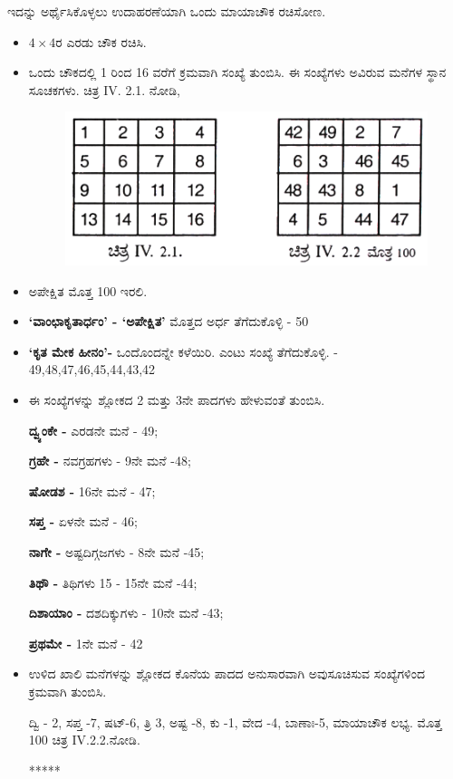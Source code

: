 ಇದನ್ನು ಅರ್ಥೈಸಿಕೊಳ್ಳಲು ಉದಾಹರಣೆಯಾಗಿ ಒಂದು ಮಾಯಾಚೌಕ ರಚಿಸೋಣ.
\begin{itemize}
	\item $4 \times 4$ರ ಎರಡು ಚೌಕ ರಚಿಸಿ.
	\item ಒಂದು ಚೌಕದಲ್ಲಿ 1 ರಿಂದ 16 ವರೆಗೆ ಕ್ರಮವಾಗಿ ಸಂಖ್ಯೆ ತುಂಬಿಸಿ. ಈ ಸಂಖ್ಯೆಗಳು ಅವಿರುವ ಮನೆಗಳ ಸ್ಥಾನ ಸೂಚಕಗಳು. ಚಿತ್ರ IV. 2.1. ನೋಡಿ,
	\begin{figure}[h]
	\includegraphics[scale=.9]{src/figures/chap3/fig3.40.jpg}
	\end{figure}
	\item ಅಪೇಕ್ಷಿತ ಮೊತ್ತ 100 ಇರಲಿ.
	\item \textbf{‘ವಾಂಛಾಕೃತಾರ್ಧಂ’ - ‘ಅಪೇಕ್ಷಿತ’} ಮೊತ್ತದ ಅರ್ಧ ತೆಗೆದುಕೊಳ್ಳಿ - 50
	\item \textbf{‘ಕೃತ ಮೇಕ ಹೀನಂ’-} ಒಂದೊಂದನ್ನೇ ಕಳೆಯಿರಿ. ಎಂಟು ಸಂಖ್ಯೆ ತೆಗೆದುಕೊಳ್ಳಿ. - 49,48,47,46,45,44,43,42
	\item ಈ ಸಂಖ್ಯೆಗಳನ್ನು ಶ್ಲೋಕದ 2 ಮತ್ತು 3ನೇ ಪಾದಗಳು ಹೇಳುವಂತೆ ತುಂಬಿಸಿ.

	\textbf{ದ್ವ್ಯಂಕೇ - }ಎರಡನೇ ಮನೆ - 49;

	\textbf{ಗ್ರಹೇ -} ನವಗ್ರಹಗಳು - 9ನೇ ಮನೆ -48;

	\textbf{ಷೋಡಶ -} 16ನೇ ಮನೆ - 47;

	\textbf{ಸಪ್ತ -} ಏಳನೇ ಮನೆ - 46;

	\textbf{ನಾಗೇ -} ಅಷ್ಟದಿಗ್ಗಜಗಳು - 8ನೇ ಮನೆ -45;

	\textbf{ತಿಥೌ -} ತಿಥಿಗಳು 15 - 15ನೇ ಮನೆ -44;

	\textbf{ದಿಶಾಯಾಂ -} ದಶದಿಕ್ಕುಗಳು - 10ನೇ ಮನೆ -43;

	\textbf{ಪ್ರಥಮೇ -} 1ನೇ ಮನೆ - 42

	\item ಉಳಿದ ಖಾಲಿ ಮನೆಗಳನ್ನು ಶ್ಲೋಕದ ಕೊನೆಯ ಪಾದದ ಅನುಸಾರವಾಗಿ ಅವು\break ಸೂಚಿಸುವ ಸಂಖ್ಯೆಗಳಿಂದ ಕ್ರಮವಾಗಿ ತುಂಬಿಸಿ.

	ದ್ವಿ  - 2, ಸಪ್ತ -7, ಷಟ್-6,  ತ್ರಿ 3, ಅಷ್ಟ -8, ಕು -1, ವೇದ -4, ಬಾಣಾಃ-5, ಮಾಯಾಚೌಕ ಲಭ್ಯ. ಮೊತ್ತ 100 ಚಿತ್ರ IV.2.2.ನೋಡಿ.
	\begin{center}
	*****
	\end{center}
\end{itemize}

